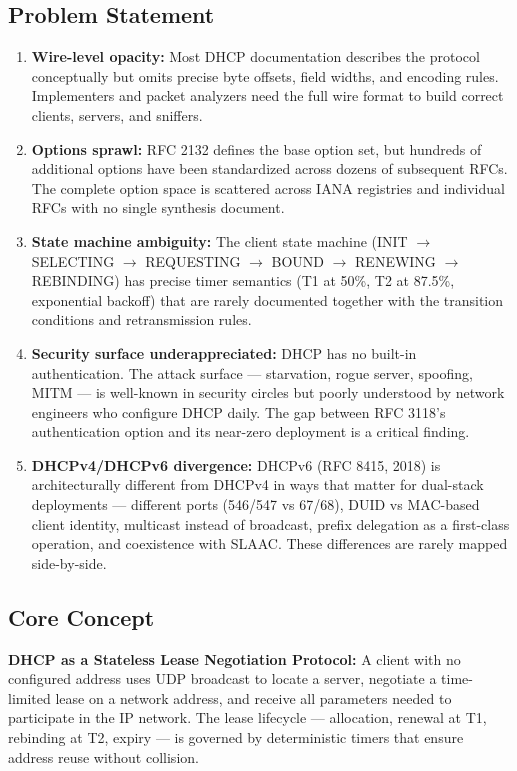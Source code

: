 \documentclass[11pt,letterpaper]{article}
\begin{document}
\subsection{Problem Statement}

\begin{enumerate}
  \item \textbf{Wire-level opacity:} Most DHCP documentation describes the protocol conceptually but omits precise byte offsets, field widths, and encoding rules. Implementers and packet analyzers need the full wire format to build correct clients, servers, and sniffers.
  \item \textbf{Options sprawl:} RFC 2132 defines the base option set, but hundreds of additional options have been standardized across dozens of subsequent RFCs. The complete option space is scattered across IANA registries and individual RFCs with no single synthesis document.
  \item \textbf{State machine ambiguity:} The client state machine (INIT $\to$ SELECTING $\to$ REQUESTING $\to$ BOUND $\to$ RENEWING $\to$ REBINDING) has precise timer semantics (T1 at 50\%, T2 at 87.5\%, exponential backoff) that are rarely documented together with the transition conditions and retransmission rules.
  \item \textbf{Security surface underappreciated:} DHCP has no built-in authentication. The attack surface --- starvation, rogue server, spoofing, MITM --- is well-known in security circles but poorly understood by network engineers who configure DHCP daily. The gap between RFC 3118's authentication option and its near-zero deployment is a critical finding.
  \item \textbf{DHCPv4/DHCPv6 divergence:} DHCPv6 (RFC 8415, 2018) is architecturally different from DHCPv4 in ways that matter for dual-stack deployments --- different ports (546/547 vs 67/68), DUID vs MAC-based client identity, multicast instead of broadcast, prefix delegation as a first-class operation, and coexistence with SLAAC. These differences are rarely mapped side-by-side.
\end{enumerate}

\subsection{Core Concept}

\textbf{DHCP as a Stateless Lease Negotiation Protocol:} A client with no configured address uses UDP broadcast to locate a server, negotiate a time-limited lease on a network address, and receive all parameters needed to participate in the IP network. The lease lifecycle --- allocation, renewal at T1, rebinding at T2, expiry --- is governed by deterministic timers that ensure address reuse without collision.
\end{document}
